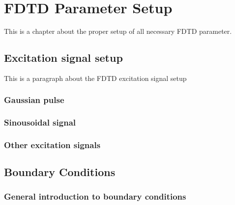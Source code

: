 \chapter{FDTD Parameter Setup}
This is a chapter about the proper setup of all necessary FDTD parameter.

\section{Excitation signal setup}
This is a paragraph about the FDTD excitation signal setup

    \subsection{Gaussian pulse}

    \subsection{Sinousoidal signal}

    \subsection{Other excitation signals}


\section{Boundary Conditions}\label{sec:BC}
    \subsection{General introduction to boundary conditions}\label{subsec:General introduction to BC}
